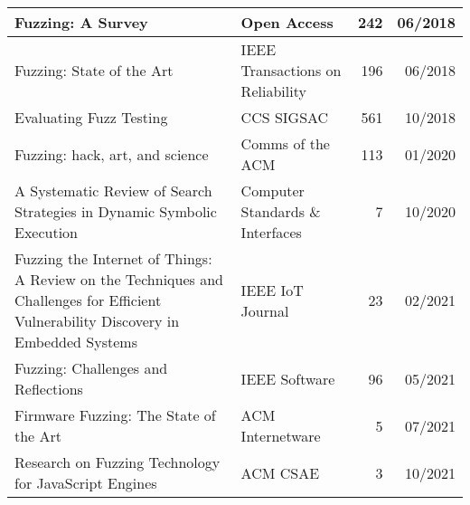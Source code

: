 \documentclass{article}
\begin{document}
\begin{longtable}{|P{0.44\textwidth}|P{0.32\textwidth}|r|r|}
    Fuzzing: A Survey\cite{FuzzingASurvey}                                                                                                        & Open Access                                                & 242            & 06/2018       \\\hline
    Fuzzing: State of the Art\cite{FuzzingStateOfTheArt2018}                                                                                      & IEEE Transactions on Reliability                           & 196            & 06/2018       \\\hline
    Evaluating Fuzz Testing\cite{EvaluatingFuzzTesting}                                                                                           & CCS SIGSAC                                                 & 561            & 10/2018       \\\hline
    Fuzzing: hack, art, and science\cite{HackArtScience}                                                                                          & Comms of the ACM                                           & 113            & 01/2020       \\\hline
    A Systematic Review of Search Strategies in Dynamic Symbolic Execution\cite{SearchStrategies}                                                 & Computer Standards \& Interfaces                           & 7              & 10/2020       \\\hline
    Fuzzing the Internet of Things: A Review on the Techniques and Challenges for Efficient Vulnerability Discovery in Embedded Systems\cite{IoT} & IEEE IoT Journal                                           & 23             & 02/2021       \\\hline
    Fuzzing: Challenges and Reflections\cite{ChallengesAndReflections}                                                                            & IEEE Software                                              & 96             & 05/2021       \\\hline
    Firmware Fuzzing: The State of the Art\cite{Firmware}                                                                                         & ACM Internetware                                           & 5              & 07/2021       \\\hline
    Research on Fuzzing Technology for JavaScript Engines\cite{JavaScript}                                                                        & ACM CSAE                                                   & 3              & 10/2021       \\\hline

\end{longtable}
\end{document}
